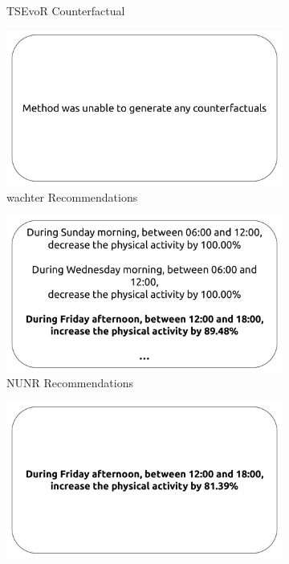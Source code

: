 \begin{figure}[t]
\begin{subfigure}[b]{0.24\textwidth}
         \caption{TSEvoR Counterfactual}
         \label{fig:cf:tsevo}
     \end{subfigure}

          \begin{subfigure}[b]{0.24\textwidth}
         \centering
         \includegraphics[width=\textwidth]{images/6306/0_6306_TCN_Wachter_reco.pdf}
         \caption{\gls{wachter} Recommendations}
         \label{fig:reco:wachter}
     \end{subfigure}
     \hfill
     \begin{subfigure}[b]{0.24\textwidth}
         \centering
         \includegraphics[width=\textwidth]{images/6306/4_6306_TCN_NUN_reco_bold.pdf}
         \caption{NUNR Recommendations}
         \label{fig:reco:nun}
     \end{subfigure}
     \hfill
     \begin{subfigure}[b]{0.24\textwidth}
         \centering
         \includegraphics[width=\textwidth]{images/6306/1_6306_TCN_DBA_reco_bold.pdf}

\end{subfigure}
\end{figure}
